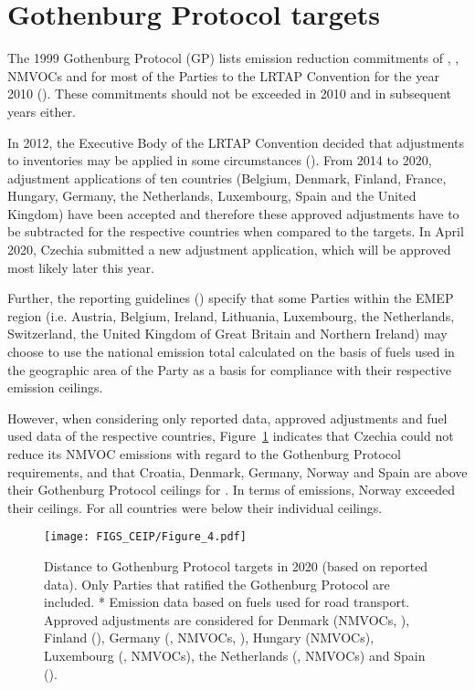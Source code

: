 \section{Gothenburg Protocol targets}

The 1999 Gothenburg Protocol (GP) lists emission reduction commitments of  \nox,
\sox, NMVOCs and \nhiii for most of the Parties to the LRTAP Convention for the year 2010 (\cite{UNECE1999}). These commitments should not be exceeded in 2010 and in subsequent years either.

In 2012, the Executive Body of the LRTAP Convention decided that adjustments to inventories may be applied in some circumstances (\cite{UNECE2012}). From 2014 to 2020, adjustment applications of ten countries (Belgium, Denmark, Finland, France, Hungary, Germany, the Netherlands, Luxembourg, Spain and the United Kingdom) have been accepted and therefore these approved adjustments have to be subtracted for the respective countries when compared to the targets. In April 2020, Czechia submitted a new adjustment application, which will be approved most likely later this year.

Further, the reporting guidelines (\cite{UNECE2014}) specify that some Parties within the EMEP region (i.e. Austria, Belgium, Ireland, Lithuania, Luxembourg, the Netherlands, Switzerland, the United Kingdom of Great Britain and Northern Ireland) may choose to use the national emission total calculated on the basis of fuels used in the geographic area of the Party as a basis for compliance with their respective emission ceilings.

However, when considering only reported data, approved adjustments and fuel used data of the respective countries, Figure~\ref{fig:CEIP4} indicates that Czechia could not reduce its NMVOC emissions with regard to the Gothenburg Protocol requirements, and that Croatia, Denmark,  Germany, Norway and Spain are above their Gothenburg Protocol ceilings for \nhiii. In terms of \nox emissions, Norway exceeded their ceilings. For \sox all countries were below their individual ceilings.


\begin{figure}[h]
\centering
{\texttt{[image: FIGS\_CEIP/Figure\_4.pdf]}}
\caption{Distance to Gothenburg Protocol targets in 2020 (based on reported data).
  Only Parties that ratified the Gothenburg Protocol are included. 
  * Emission data based on fuels used for road transport.
Approved adjustments are considered for  Denmark (NMVOCs, \nhiii), Finland (\nhiii),  Germany (\nox, NMVOCs, \nhiii), Hungary (NMVOCs), Luxembourg (\nox, NMVOCs), the Netherlands (\nhiii, NMVOCs) and Spain (\nox).}
\label{fig:CEIP4}
\end{figure}


